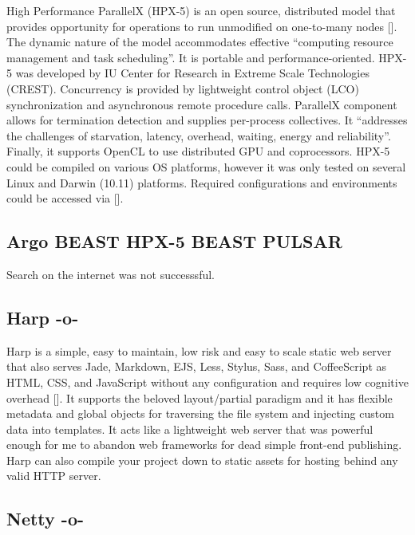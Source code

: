 High Performance ParallelX (HPX-5) is an open source, distributed
model that provides opportunity for operations to run unmodified on
one-to-many nodes [\cite{www-hpx-5}].  The dynamic nature of the model
accommodates effective ``computing resource management and task
scheduling''. It is portable and performance-oriented. HPX-5 was
developed by IU Center for Research in Extreme Scale Technologies
(CREST). Concurrency is provided by lightweight control object (LCO)
synchronization and asynchronous remote procedure calls. ParallelX
component allows for termination detection and supplies per-process
collectives. It ``addresses the challenges of starvation, latency,
overhead, waiting, energy and reliability''. Finally, it supports
OpenCL to use distributed GPU and coprocessors. HPX-5 could be
compiled on various OS platforms, however it was only tested on
several Linux and Darwin (10.11) platforms. Required configurations
and environments could be accessed via [\cite{www-hpx-5-user-guide}].


   
   
\subsection{Argo BEAST HPX-5 BEAST PULSAR}

     Search on the internet was not successsful.
     
\subsection{Harp -o-}

Harp is a simple, easy to maintain, low risk and easy to scale static
web server that also serves Jade, Markdown, EJS, Less, Stylus, Sass,
and CoffeeScript as HTML, CSS, and JavaScript without any
configuration and requires low cognitive overhead [\cite{www-harp}]. It
supports the beloved layout/partial paradigm and it has flexible
metadata and global objects for traversing the file system and
injecting custom data into templates. It acts like a lightweight web
server that was powerful enough for me to abandon web frameworks for
dead simple front-end publishing. Harp can also compile your project
down to static assets for hosting behind any valid HTTP server.


     
\subsection{Netty -o-}


